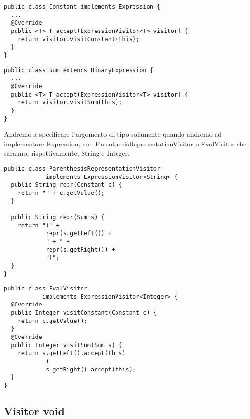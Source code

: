 \begin{multicols}{2}
\begin{lstlisting}
public class Constant implements Expression {
  ...
  @Override
  public <T> T accept(ExpressionVisitor<T> visitor) {
    return visitor.visitConstant(this);
  }
}
\end{lstlisting}
\columnbreak
\begin{lstlisting}
public class Sum extends BinaryExpression {
  ...
  @Override
  public <T> T accept(ExpressionVisitor<T> visitor) {
    return visitor.visitSum(this);
  }
}
\end{lstlisting}
\end{multicols}
  
Andremo a specificare l'argomento di tipo solamente quando andremo ad implementare Expression, con ParenthesisRepresentationVisitor o EvalVisitor che saranno,
rispettivamente, String e Integer.
\begin{multicols}{2}
\begin{lstlisting}
public class ParenthesisRepresentationVisitor
            implements ExpressionVisitor<String> {
  public String repr(Constant c) {
    return "" + c.getValue();
  }

  public String repr(Sum s) {
    return "(" +
            repr(s.getLeft()) +
            " + " +
            repr(s.getRight()) +
            ")";
  }
}
\end{lstlisting}
\columnbreak
\begin{lstlisting}
public class EvalVisitor
           implements ExpressionVisitor<Integer> {
  @Override
  public Integer visitConstant(Constant c) {
    return c.getValue();
  }
  @Override
  public Integer visitSum(Sum s) {
    return s.getLeft().accept(this)
            +
            s.getRight().accept(this);
  }
}
\end{lstlisting}
\end{multicols}

\subsection{Visitor void}

